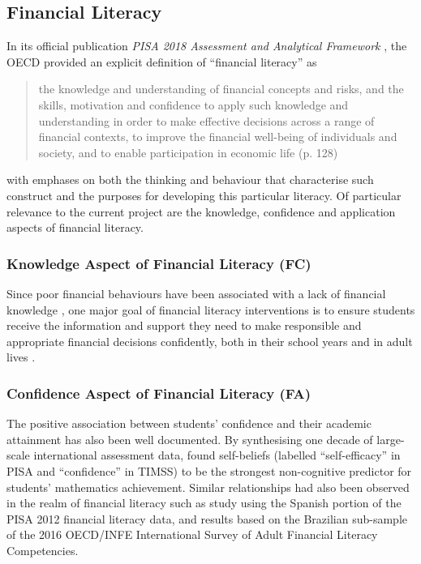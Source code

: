 \subsection{Financial Literacy}\label{sec:flit}

In its official publication \textit{PISA 2018 Assessment and Analytical Framework} \citep{PISAframework}, the OECD provided an explicit definition of ``financial literacy'' as
    \begin{quotation}
        the knowledge and understanding of financial concepts and risks, and the skills, motivation and confidence to apply such knowledge and understanding in order to make effective decisions across a range of financial contexts, to improve the financial well-being of individuals and society, and to enable participation in economic life (p. 128)
    \end{quotation}
with emphases on both the thinking and behaviour that characterise such construct and the purposes for developing this particular literacy. Of particular relevance to the current project are the knowledge, confidence and application aspects of financial literacy.


\subsubsection{Knowledge Aspect of Financial Literacy (FC)}

Since poor financial behaviours have been associated with a lack of financial knowledge \citep{hastings:2013, lusardi:2014}, one major goal of financial literacy interventions is to ensure students receive the information and support they need to make responsible and appropriate financial decisions confidently, both in their school years and in adult lives \citep{PISAvol4}.

\subsubsection{Confidence Aspect of Financial Literacy (FA)}

The positive association between students' confidence and their academic attainment has also been well documented. By synthesising one decade of large-scale international assessment data, \citet{lee:2018} found self-beliefs (labelled ``self-efficacy'' in PISA and ``confidence'' in TIMSS) to be the strongest non-cognitive predictor for students' mathematics achievement. Similar relationships had also been observed in the realm of financial literacy such as  study using the Spanish portion of the PISA 2012 financial literacy data, and  results based on the Brazilian sub-sample of the 2016 OECD/INFE International Survey of Adult Financial Literacy Competencies.

